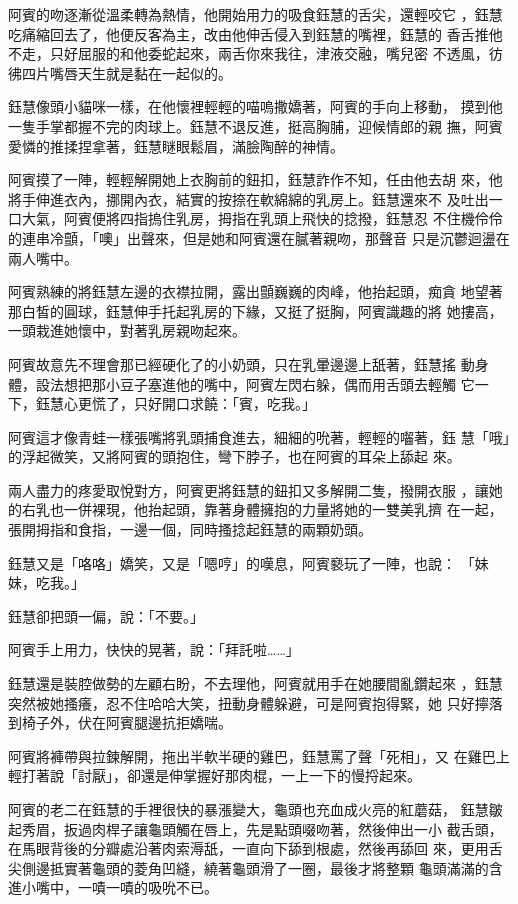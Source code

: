阿賓的吻逐漸從溫柔轉為熱情，他開始用力的吸食鈺慧的舌尖，還輕咬它
，鈺慧吃痛縮回去了，他便反客為主，改由他伸舌侵入到鈺慧的嘴裡，鈺慧的
香舌推他不走，只好屈服的和他委蛇起來，兩舌你來我往，津液交融，嘴兒密
不透風，彷彿四片嘴唇天生就是黏在一起似的。

鈺慧像頭小貓咪一樣，在他懷裡輕輕的喵嗚撒嬌著，阿賓的手向上移動，
摸到他一隻手掌都握不完的肉球上。鈺慧不退反進，挺高胸脯，迎候情郎的親
撫，阿賓愛憐的推揉捏拿著，鈺慧瞇眼鬆眉，滿臉陶醉的神情。

阿賓摸了一陣，輕輕解開她上衣胸前的鈕扣，鈺慧詐作不知，任由他去胡
來，他將手伸進衣內，挪開內衣，結實的按捺在軟綿綿的乳房上。鈺慧還來不
及吐出一口大氣，阿賓便將四指摀住乳房，拇指在乳頭上飛快的捻撥，鈺慧忍
不住機伶伶的連串冷顫，「噢」出聲來，但是她和阿賓還在膩著親吻，那聲音
只是沉鬱迴盪在兩人嘴中。

阿賓熟練的將鈺慧左邊的衣襟拉開，露出顫巍巍的肉峰，他抬起頭，痴貪
地望著那白皙的圓球，鈺慧伸手托起乳房的下緣，又挺了挺胸，阿賓識趣的將
她摟高，一頭栽進她懷中，對著乳房親吻起來。

阿賓故意先不理會那已經硬化了的小奶頭，只在乳暈邊邊上舐著，鈺慧搖
動身體，設法想把那小豆子塞進他的嘴中，阿賓左閃右躲，偶而用舌頭去輕觸
它一下，鈺慧心更慌了，只好開口求饒：「賓，吃我。」

阿賓這才像青蛙一樣張嘴將乳頭捕食進去，細細的吮著，輕輕的囓著，鈺
慧「哦」的浮起微笑，又將阿賓的頭抱住，彎下脖子，也在阿賓的耳朵上舔起
來。

兩人盡力的疼愛取悅對方，阿賓更將鈺慧的鈕扣又多解開二隻，撥開衣服
，讓她的右乳也一併裸現，他抬起頭，靠著身體擁抱的力量將她的一雙美乳擠
在一起，張開拇指和食指，一邊一個，同時搔捻起鈺慧的兩顆奶頭。

鈺慧又是「咯咯」嬌笑，又是「嗯哼」的嘆息，阿賓褻玩了一陣，也說：
「妹妹，吃我。」

鈺慧卻把頭一偏，說：「不要。」

阿賓手上用力，快快的晃著，說：「拜託啦……」

鈺慧還是裝腔做勢的左顧右盼，不去理他，阿賓就用手在她腰間亂鑽起來
，鈺慧突然被她搔癢，忍不住哈哈大笑，扭動身體躲避，可是阿賓抱得緊，她
只好擰落到椅子外，伏在阿賓腿邊抗拒嬌喘。

阿賓將褲帶與拉鍊解開，拖出半軟半硬的雞巴，鈺慧罵了聲「死相」，又
在雞巴上輕打著說「討厭」，卻還是伸掌握好那肉棍，一上一下的慢捋起來。

阿賓的老二在鈺慧的手裡很快的暴漲變大，龜頭也充血成火亮的紅蘑菇，
鈺慧皺起秀眉，扳過肉桿子讓龜頭觸在唇上，先是點頭啜吻著，然後伸出一小
截舌頭，在馬眼背後的分瓣處沿著肉索溽舐，一直向下舔到根處，然後再舔回
來，更用舌尖側邊抵實著龜頭的菱角凹縫，繞著龜頭滑了一圈，最後才將整顆
龜頭滿滿的含進小嘴中，一嘖一嘖的吸吮不已。

